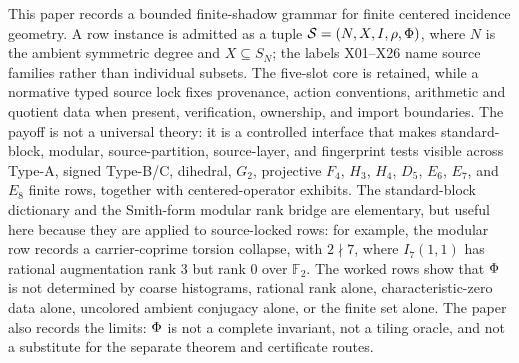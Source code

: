 This paper records a bounded finite-shadow grammar for finite centered incidence geometry.  A row instance is admitted as a tuple \(\mathcal S=(N,X,I,\rho,\Phi)\), where \(N\) is the ambient symmetric degree and \(X\subseteq S_N\); the labels X01--X26 name source families rather than individual subsets.  The five-slot core is retained, while a normative typed source lock fixes provenance, action conventions, arithmetic and quotient data when present, verification, ownership, and import boundaries.  The payoff is not a universal theory: it is a controlled interface that makes standard-block, modular, source-partition, source-layer, and fingerprint tests visible across Type-A, signed Type-B/C, dihedral, \(G_2\), projective \(F_4\), \(H_3\), \(H_4\), \(D_5\), \(E_6\), \(E_7\), and \(E_8\) finite rows, together with centered-operator exhibits.  The standard-block dictionary and the Smith-form modular rank bridge are elementary, but useful here because they are applied to source-locked rows: for example, the modular row records a carrier-coprime torsion collapse, with \(2\nmid7\), where \(I_7(1,1)\) has rational augmentation rank 3 but rank 0 over \(\mathbb F_2\).  The worked rows show that \(\Phi\) is not determined by coarse histograms, rational rank alone, characteristic-zero data alone, uncolored ambient conjugacy alone, or the finite set alone.  The paper also records the limits: \(\Phi\) is not a complete invariant, not a tiling oracle, and not a substitute for the separate theorem and certificate routes.